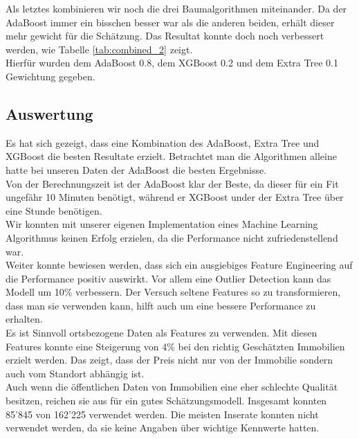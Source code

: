 %
Als letztes kombinieren wir noch die drei Baumalgorithmen miteinander. Da der AdaBoost immer ein bisschen besser war als die anderen beiden, erhält dieser mehr gewicht für die Schätzung. Das Resultat konnte doch noch verbessert werden, wie Tabelle \ref{tab:combined_2} zeigt.\\
Hierfür wurden dem AdaBoost 0.8, dem XGBoost 0.2 und dem Extra Tree 0.1  Gewichtung gegeben.
%
\begin{table}[ht]
\centering
{}
\caption{Ergebnisse ohne ortsbezogenen Daten vom BFS}
\label{tab:combined_2}
\end{table}
%
\subsection{Auswertung}
Es hat sich gezeigt, dass eine Kombination des AdaBoost, Extra Tree und XGBoost die besten Resultate erzielt. Betrachtet man die Algorithmen alleine hatte bei unseren Daten der AdaBoost die besten Ergebnisse.\\ 
Von der Berechnungszeit ist der AdaBoost klar der Beste, da dieser für ein Fit ungefähr 10 Minuten benötigt, während er XGBoost under der Extra Tree über eine Stunde benötigen.\\
Wir konnten mit unserer eigenen Implementation eines Machine Learning Algorithmus keinen Erfolg erzielen, da die Performance nicht zufriedenstellend war.\\[2ex]
%
Weiter konnte bewiesen werden, dass sich ein ausgiebiges Feature Engineering auf die Performance positiv auswirkt. Vor allem eine Outlier Detection kann das Modell um 10\% verbessern. Der Versuch seltene Features so zu transformieren, dass man sie verwenden kann, hilft auch um eine bessere Performance zu erhalten. \\
Es ist Sinnvoll ortsbezogene Daten als Features zu verwenden. Mit diesen Features konnte eine Steigerung von 4\% bei den richtig Geschätzten Immobilien erzielt werden. Das zeigt, dass der Preis nicht nur von der Immobilie sondern auch vom Standort abhängig ist. \\[2ex]
%
Auch wenn die öffentlichen Daten von Immobilien eine eher schlechte Qualität besitzen, reichen sie aus für ein gutes Schätzungsmodell. Insgesamt konnten 85’845 von 162’225 verwendet werden. Die meisten Inserate konnten nicht verwendet werden, da sie keine Angaben über wichtige Kennwerte hatten.


